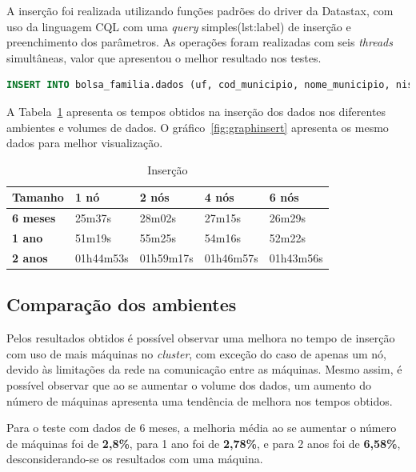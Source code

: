 A inserção foi realizada utilizando funções padrões do driver da Datastax, com uso da linguagem CQL com uma \emph{query} simples(lst:label) de inserção e preenchimento dos parâmetros. As operações foram realizadas com seis \emph{threads} simultâneas, valor que apresentou o melhor resultado nos testes. 

\begin{lstlisting}[caption={Código CQL para inserção},label={lst:label},language=SQL]
INSERT INTO bolsa_familia.dados (uf, cod_municipio, nome_municipio, nis_favorecido, nome_favorecido, fonte, valor, periodo) VALUES (?, ?, ?, ?, ?, ?, ?, ?)
\end{lstlisting}

A Tabela~\ref{tb_insert} apresenta os tempos obtidos na inserção dos dados nos diferentes ambientes e volumes de dados. O gráfico~\ref{fig:graphinsert} apresenta os mesmo dados para melhor visualização.


\begin{table}[]
	\centering
	\caption{Inserção}
	\label{tb_insert}
	\begin{tabular}{lllll}
		\textbf{Tamanho}	& \textbf{1 nó} & \textbf{2 nós} & \textbf{4 nós} & \textbf{6 nós} \\ \hline
		\textbf{6 meses}    & 25m37s        & 28m02s         & 27m15s         & 26m29s         \\ \hline
		\textbf{1 ano}      & 51m19s        & 55m25s         & 54m16s         & 52m22s         \\ \hline
		\textbf{2 anos}     & 01h44m53s     & 01h59m17s      & 01h46m57s      & 01h43m56s      \\ \hline
	\end{tabular}
\end{table}

\subsection{Comparação dos ambientes}

Pelos resultados obtidos é possível observar uma melhora no tempo de inserção com uso de mais máquinas no \emph{cluster}, com exceção do caso de apenas um nó, devido às limitações da rede na comunicação entre as máquinas. Mesmo assim, é possível observar que ao se aumentar o volume dos dados, um aumento do número de máquinas apresenta uma tendência de melhora nos tempos obtidos.

Para o teste com dados de 6 meses, a melhoria média ao se aumentar o número de máquinas foi de \textbf{2,8\%}, para 1 ano foi de \textbf{2,78\%}, e para 2 anos foi de \textbf{6,58\%}, desconsiderando-se os resultados com uma máquina.

